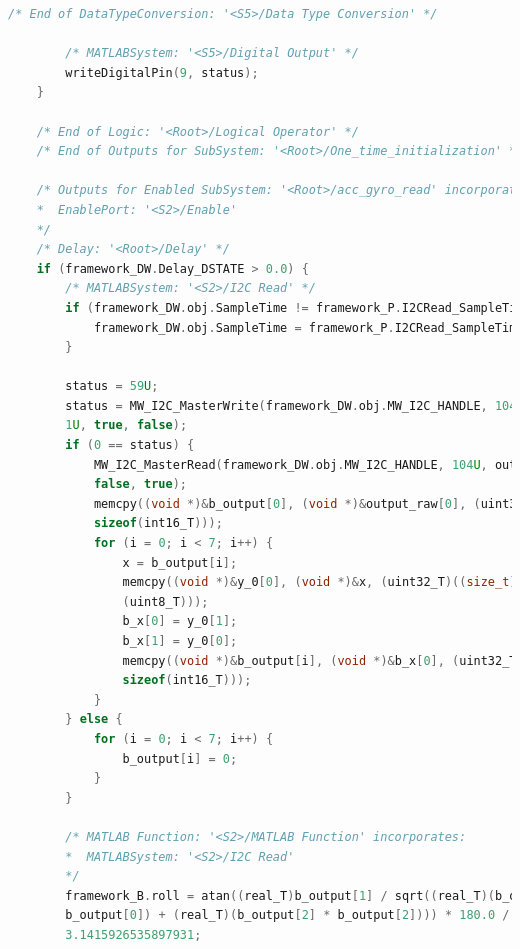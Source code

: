 \begin{lstlisting}[caption={Automatically generated C code}, language=c,label={lst:acg}]
		/* End of DataTypeConversion: '<S5>/Data Type Conversion' */
		
		/* MATLABSystem: '<S5>/Digital Output' */
		writeDigitalPin(9, status);
	}
	
	/* End of Logic: '<Root>/Logical Operator' */
	/* End of Outputs for SubSystem: '<Root>/One_time_initialization' */
	
	/* Outputs for Enabled SubSystem: '<Root>/acc_gyro_read' incorporates:
	*  EnablePort: '<S2>/Enable'
	*/
	/* Delay: '<Root>/Delay' */
	if (framework_DW.Delay_DSTATE > 0.0) {
		/* MATLABSystem: '<S2>/I2C Read' */
		if (framework_DW.obj.SampleTime != framework_P.I2CRead_SampleTime) {
			framework_DW.obj.SampleTime = framework_P.I2CRead_SampleTime;
		}
		
		status = 59U;
		status = MW_I2C_MasterWrite(framework_DW.obj.MW_I2C_HANDLE, 104U, &status,
		1U, true, false);
		if (0 == status) {
			MW_I2C_MasterRead(framework_DW.obj.MW_I2C_HANDLE, 104U, output_raw, 14U,
			false, true);
			memcpy((void *)&b_output[0], (void *)&output_raw[0], (uint32_T)((size_t)7 *
			sizeof(int16_T)));
			for (i = 0; i < 7; i++) {
				x = b_output[i];
				memcpy((void *)&y_0[0], (void *)&x, (uint32_T)((size_t)2 * sizeof
				(uint8_T)));
				b_x[0] = y_0[1];
				b_x[1] = y_0[0];
				memcpy((void *)&b_output[i], (void *)&b_x[0], (uint32_T)((size_t)1 *
				sizeof(int16_T)));
			}
		} else {
			for (i = 0; i < 7; i++) {
				b_output[i] = 0;
			}
		}
		
		/* MATLAB Function: '<S2>/MATLAB Function' incorporates:
		*  MATLABSystem: '<S2>/I2C Read'
		*/
		framework_B.roll = atan((real_T)b_output[1] / sqrt((real_T)(b_output[0] *
		b_output[0]) + (real_T)(b_output[2] * b_output[2]))) * 180.0 /
		3.1415926535897931;
		
	\end{lstlisting}
